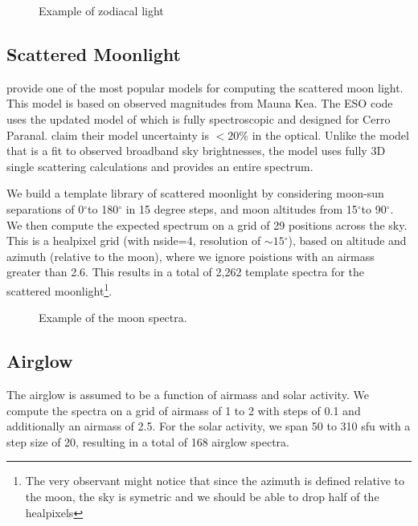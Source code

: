 \documentclass{emulateapj}  %
\newcommand\degree{{^\circ}}
\begin{document}
{\begin{figure}
  \caption{Example of zodiacal light \label{fig:zodiacal}}
\end{figure}


\subsection{Scattered Moonlight}

\citet{Krisciunas91} provide one of the most popular models for computing the scattered moon light. This model is based on observed magnitudes from Mauna Kea. The ESO code uses the updated model of \citet{Jones13} which is fully spectroscopic and designed for Cerro Paranal. \citet{Jones13} claim their model uncertainty is $<20$\% in the optical.  Unlike the \citet{Krisciunas91} model that is a fit to observed broadband sky brightnesses, the \citet{Jones13} model uses fully 3D single scattering calculations and provides an entire spectrum.

We build a template library of scattered moonlight by considering moon-sun separations of 0$\degree$to 180$\degree$ in 15 degree steps, and moon altitudes from 15$\degree$to 90$\degree$.  We then compute the expected spectrum on a grid of 29 positions across the sky. This is a healpixel grid (with nside=4, resolution of $\sim15\degree$), based on altitude and azimuth (relative to the moon), where we ignore poistions with an airmass greater than 2.6. This results in a total of 2,262 template spectra for the scattered moonlight\footnote{The very observant might notice that since the azimuth is defined relative to the moon, the sky is symetric and we should be able to drop half of the healpixels}.

\begin{figure}
  \caption{Example of the moon spectra. \label{fig:moon}}
\end{figure}


\subsection{Airglow}

The airglow is assumed to be a function of airmass and solar activity.  We compute the spectra on a grid of airmass of 1 to 2 with steps of 0.1 and additionally an airmass of 2.5.  For the solar activity, we span 50 to 310 sfu with a step size of 20, resulting in a total of 168 airglow spectra. 

}
\end{document}
